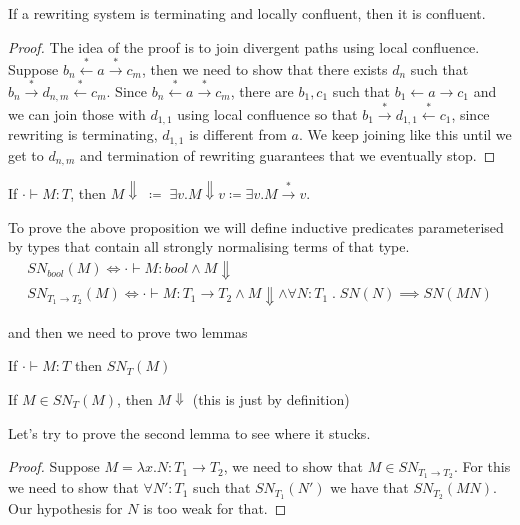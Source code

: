 \documentclass[acmsmall,screen, nonacm, anonymous]{acmart}
\begin{document}
\begin{proposition}
  If a rewriting system is terminating and locally confluent, then it is confluent.
\end{proposition}
\begin{proof}
  The idea of the proof is to join divergent paths using local confluence.
  Suppose $b_n \xleftarrow{*} a \xrightarrow{*} c_m$, then we need to show that there exists $d_n$ such that $b_n \xrightarrow{*} d_{n,m} \xleftarrow{*} c_m$.
  Since $b_n \xleftarrow{*} a \xrightarrow{*} c_m$, there are $b_1, c_1$ such that $b_1 \xleftarrow{} a \xrightarrow{} c_1$ and we can join those with $d_{1,1}$ using local confluence so that $b_1 \xrightarrow{*} d_{1,1} \xleftarrow{*} c_1$, since rewriting is terminating, $d_{1,1}$ is different from $a$.
  We keep joining like this until we get to $d_{n,m}$ and termination of rewriting guarantees that we eventually stop.
\end{proof}

\begin{proposition}
  If $\cdot \vdash M : T$, then $M \Downarrow \;\coloneqq\; \exists v . M \Downarrow v \coloneqq \exists v . M \xrightarrow{*} v$.
\end{proposition}

To prove the above proposition we will define inductive predicates parameterised by types that contain all strongly normalising terms of that type.
\begin{gather*}
SN_{bool}(M) \iff \cdot \vdash M : bool \land M \Downarrow\\
SN_{T_1 \to T_2}(M) \iff \cdot \vdash M : T_1 \to T_2 \land M \Downarrow \land \forall N : T_1 \;.\; SN(N) \implies SN(MN)
\end{gather*}

and then we need to prove two lemmas
\begin{lemma}
  If $\cdot \vdash M : T$ then $SN_{T}(M)$
\end{lemma}

\begin{lemma}
  If $M \in SN_{T}(M)$, then $M \Downarrow$ (this is just by definition)
\end{lemma}

Let's try to prove the second lemma to see where it stucks.

\begin{proof}
  Suppose $M = \lambda x . N : T_1 \to T_2$, we need to show that $M \in SN_{T_1 \to T_2}$.
  For this we need to show that $\forall N' : T_1$ such that $SN_{T_1}(N')$ we have that $SN_{T_2}(MN)$.
  Our hypothesis for $N$ is too weak for that.
\end{proof}
\end{document}
